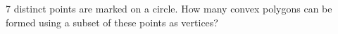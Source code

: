 7 distinct points are marked on a circle. How many convex polygons can be formed using a subset of these points as vertices?
